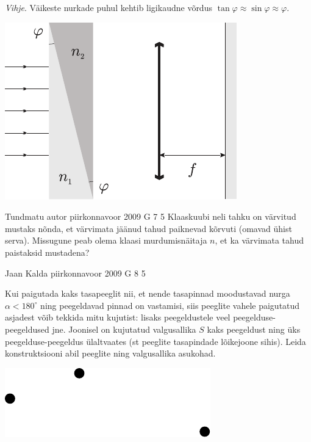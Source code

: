 \documentclass[11pt, twoside]{article}
\begin{document}
{{\emph{Vihje}. Väikeste nurkade puhul kehtib ligikaudne võrdus $\tan \varphi \approx \sin \varphi \approx \varphi $.

\begin{center}
	\includegraphics[width=0.6\linewidth]{2006-lahg-06-yl}
\end{center}
\fi
}

{Tundmatu autor} %
{piirkonnavoor} %
{2009} %
{G 7} %
{5} %
{
\ifStatement
Klaaskuubi neli tahku on värvitud mustaks nõnda,
et värvimata jäänud tahud paiknevad kõrvuti (omavad ühist serva). Missugune peab olema klaasi murdumisnäitaja $n$, et ka värvimata tahud
paistaksid mustadena?
\fi
}

{Jaan Kalda} %
{piirkonnavoor} %
{2009} %
{G 8} %
{5} %
{
\ifStatement
Kui paigutada kaks tasapeeglit nii, et nende tasapinnad moodustavad nurga $\alpha<180^\circ$ ning peegeldavad pinnad on vastamisi, siis peeglite vahele paigutatud asjadest võib tekkida mitu kujutist: lisaks peegeldustele veel peegelduse-peegeldused jne. Joonisel on kujutatud valgusallika $S$ kaks peegeldust ning üks peegelduse-peegeldus ülaltvaates (st peeglite tasapindade lõikejoone sihis). Leida konstruktsiooni abil peeglite ning valgusallika asukohad.\\

\begin{center}
	\includegraphics[width=0.6\linewidth]{2009-v2g-08-yl}
\end{center}
\fi
}

}
\end{document}
